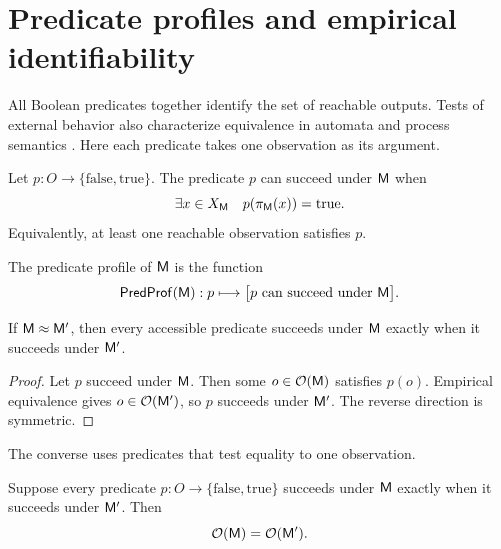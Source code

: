 \section{Predicate profiles and empirical identifiability}
\label{sec:predicates}

All Boolean predicates together identify the set of reachable outputs. Tests of external behavior also characterize equivalence in automata and process semantics \parencite{Moore1956,Park1981,Milner1989,Rutten2000}. Here each predicate takes one observation as its argument.

\begin{definition}
Let \(p:O\to\{\mathrm{false},\mathrm{true}\}\). The predicate \(p\) can succeed under \(\mathsf M\) when
\[
\exists x\in X_\mathsf M
\quad
p(\pi_\mathsf M(x))=\mathrm{true}.
\]
Equivalently, at least one reachable observation satisfies \(p\).
\end{definition}
\begin{definition}
The predicate profile of \(\mathsf M\) is the function
\[
\mathsf{PredProf}(\mathsf M):p\longmapsto
\bigl[p\text{ can succeed under }\mathsf M\bigr].
\]
\end{definition}
\begin{theorem}
If \(\mathsf M\approx\mathsf M'\), then every accessible predicate succeeds under \(\mathsf M\) exactly when it succeeds under \(\mathsf M'\).
\end{theorem}

\begin{proof}
Let \(p\) succeed under \(\mathsf M\). Then some \(o\in\mathcal O(\mathsf M)\) satisfies \(p(o)\). Empirical equivalence gives \(o\in\mathcal O(\mathsf M')\), so \(p\) succeeds under \(\mathsf M'\). The reverse direction is symmetric.
\end{proof}
The converse uses predicates that test equality to one observation.

\begin{theorem}
Suppose every predicate \(p:O\to\{\mathrm{false},\mathrm{true}\}\) succeeds under \(\mathsf M\) exactly when it succeeds under \(\mathsf M'\). Then
\[
\mathcal O(\mathsf M)=\mathcal O(\mathsf M').
\]
\end{theorem}

